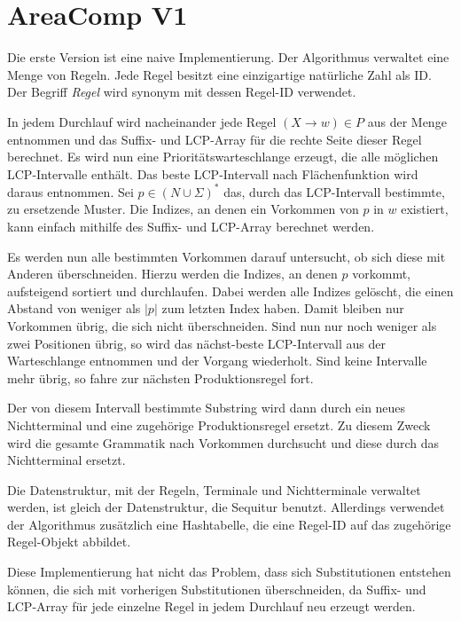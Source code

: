 \section{AreaComp V1}

Die erste Version ist eine naive Implementierung. Der Algorithmus verwaltet eine Menge von Regeln. Jede Regel besitzt eine einzigartige natürliche Zahl als ID. Der Begriff \emph{Regel} wird synonym mit dessen Regel-ID verwendet. 

In jedem Durchlauf wird nacheinander jede Regel $(X \rightarrow w) \in P$ aus der Menge entnommen und das Suffix- und LCP-Array für die rechte Seite dieser Regel berechnet. Es wird nun eine Prioritätswarteschlange erzeugt, die alle möglichen LCP-Intervalle enthält. Das beste LCP-Intervall nach Flächenfunktion wird daraus entnommen. Sei $p \in (N \cup \Sigma)^*$ das, durch das LCP-Intervall bestimmte, zu ersetzende Muster. Die Indizes, an denen ein Vorkommen von $p$ in $w$ existiert, kann einfach mithilfe des Suffix- und LCP-Array berechnet werden.

Es werden nun alle bestimmten Vorkommen darauf untersucht, ob sich diese mit Anderen überschneiden. Hierzu werden die Indizes, an denen $p$ vorkommt, aufsteigend sortiert und durchlaufen. Dabei werden alle Indizes gelöscht, die einen Abstand von weniger als $|p|$ zum letzten Index haben. Damit bleiben nur Vorkommen übrig, die sich nicht überschneiden. Sind nun nur noch weniger als zwei Positionen übrig, so wird das nächst-beste LCP-Intervall aus der Warteschlange entnommen und der Vorgang wiederholt. Sind keine Intervalle mehr übrig, so fahre zur nächsten Produktionsregel fort.

Der von diesem Intervall bestimmte Substring wird dann durch ein neues Nichtterminal und eine zugehörige Produktionsregel ersetzt. Zu diesem Zweck wird die gesamte Grammatik nach Vorkommen durchsucht und diese durch das Nichtterminal ersetzt.

Die Datenstruktur, mit der Regeln, Terminale und Nichtterminale verwaltet werden, ist gleich der Datenstruktur, die Sequitur benutzt. Allerdings verwendet der Algorithmus zusätzlich eine Hashtabelle, die eine Regel-ID auf das zugehörige Regel-Objekt abbildet.

Diese Implementierung hat nicht das Problem, dass sich Substitutionen entstehen können, die sich mit vorherigen Substitutionen überschneiden, da Suffix- und LCP-Array für jede einzelne Regel in jedem Durchlauf neu erzeugt werden. 

